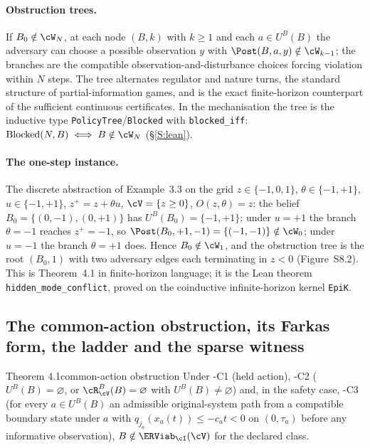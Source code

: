 \paragraph{Obstruction trees.} If $B_0\notin\cW_N$, at each node $(B,k)$ with $k\ge1$ and each $a\in U^B(B)$ the adversary can choose a possible observation $y$ with $\Post(B,a,y)\notin\cW_{k-1}$; the branches are the compatible observation-and-disturbance choices forcing violation within $N$ steps. The tree alternates regulator and nature turns, the standard structure of partial-information games, and is the exact finite-horizon counterpart of the sufficient continuous certificates. In the mechanisation the tree is the inductive type \texttt{PolicyTree}/\texttt{Blocked} with \texttt{blocked\_iff}: $\mathrm{Blocked}(N,B)\iff B\notin\cW_N$ (\S\ref{S:lean}).

\paragraph{The one-step instance.} The discrete abstraction of Example~3.3 on the grid $z\in\{-1,0,1\}$, $\theta\in\{-1,+1\}$, $u\in\{-1,+1\}$, $z^+=z+\theta u$, $\cV=\{z\ge0\}$, $O(z,\theta)=z$: the belief $B_0=\{(0,-1),(0,+1)\}$ has $U^B(B_0)=\{-1,+1\}$; under $u=+1$ the branch $\theta=-1$ reaches $z^+=-1$, so $\Post(B_0,+1,-1)=\{(-1,-1)\}\notin\cW_0$; under $u=-1$ the branch $\theta=+1$ does. Hence $B_0\notin\cW_1$, and the obstruction tree is the root $(B_0,1)$ with two adversary edges each terminating in $z<0$ (Figure~S8.2). This is Theorem~4.1 in finite-horizon language; it is the Lean theorem \texttt{hidden\_mode\_conflict}, proved on the coinductive infinite-horizon kernel \texttt{EpiK}.

\subsection{The common-action obstruction, its Farkas form, the ladder and the sparse witness}\label{S:common}

\begin{restated}{Theorem 4.1}{common-action obstruction}
Under \hyp{C1} (held action), \hyp{C2} ($U^B(B)=\varnothing$, or $\cR^B_\cV(B)=\varnothing$ with $U^B(B)\ne\varnothing$) and, in the safety case, \hyp{C3} (for every $a\in U^B(B)$ an admissible original-system path from a compatible boundary state under $a$ with $q_{j_a}(x_a(t))\le-c_at<0$ on $(0,\tau_a)$ before any informative observation), $B\notin\ERViab_\cI(\cV)$ for the declared class.
\end{restated}

